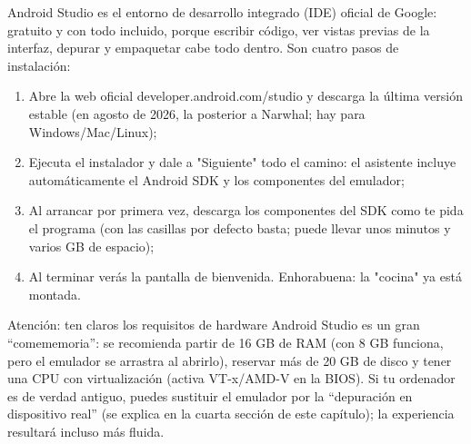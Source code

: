 


Android Studio es el entorno de desarrollo integrado (IDE) oficial de Google: gratuito y con todo incluido, porque escribir código, ver vistas previas de la interfaz, depurar y empaquetar cabe todo dentro. Son cuatro pasos de instalación:

\begin{enumerate}
  \item Abre la web oficial developer.android.com/studio y descarga la última versión estable (en agosto de 2026, la posterior a Narwhal; hay para Windows/Mac/Linux);
  \item Ejecuta el instalador y dale a "Siguiente" todo el camino: el asistente incluye automáticamente el Android SDK y los componentes del emulador;
  \item Al arrancar por primera vez, descarga los componentes del SDK como te pida el programa (con las casillas por defecto basta; puede llevar unos minutos y varios GB de espacio);
  \item Al terminar verás la pantalla de bienvenida. Enhorabuena: la "cocina" ya está montada.
\end{enumerate}

\begin{tcbwarn}{Atención: ten claros los requisitos de hardware}
Android Studio es un gran “comememoria”: se recomienda partir de 16 GB de RAM (con 8 GB funciona, pero el emulador se arrastra al abrirlo), reservar más de 20 GB de disco y tener una CPU con virtualización (activa VT-x/AMD-V en la BIOS). Si tu ordenador es de verdad antiguo, puedes sustituir el emulador por la “depuración en dispositivo real” (se explica en la cuarta sección de este capítulo); la experiencia resultará incluso más fluida.

\end{tcbwarn}


